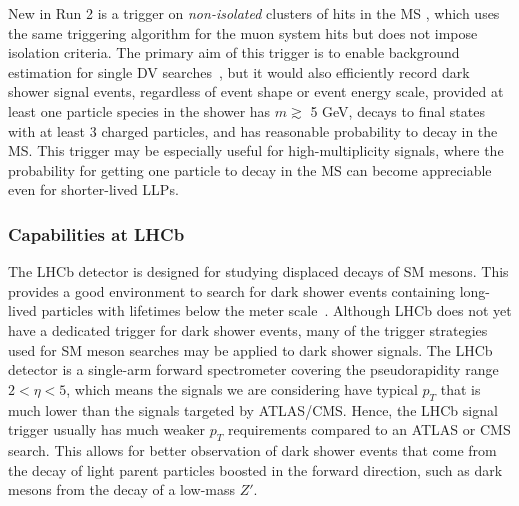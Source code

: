 \begin{enumerate}
New in Run 2 is a trigger on {\em non-isolated} clusters of hits in the MS \cite{Aaboud:2018aqj}, %
which uses the same triggering algorithm for the muon system hits but does not impose isolation criteria.  The primary aim of this trigger is to enable background estimation for single DV searches~\cite{Coccaro:2016lnz}, but it would also efficiently record dark shower signal events, regardless of event shape or event energy scale, provided at least one particle species in the shower has $m\gtrsim$ 5 GeV, decays to final states with at least 3 charged particles, and has reasonable probability to decay in the MS.  This trigger may be especially useful for high-multiplicity signals, where the probability for getting one particle to decay in the MS can become appreciable even for shorter-lived LLPs.  

\subsubsection{Capabilities at LHCb}

The LHCb detector is designed for studying displaced decays of SM mesons. This provides a good environment to search for dark shower events containing long-lived particles with lifetimes below the meter scale~\cite{Strassler:2006qa}. Although LHCb does not yet have a dedicated trigger for dark shower events, many of the trigger strategies used for SM meson searches may be applied to dark shower signals. The LHCb detector is a single-arm forward spectrometer covering the pseudorapidity range $2<\eta<5$, which means the signals we are considering have typical $p_T$ that is much lower than the signals targeted by ATLAS/CMS. Hence, the LHCb signal trigger usually has much weaker $p_T$ requirements compared to an ATLAS or CMS search. This allows for better observation of dark shower events that come from the decay of light parent particles boosted in the forward direction, such as dark mesons from the decay of a low-mass $Z'$.


\end{enumerate}
